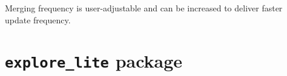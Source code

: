Merging frequency is user-adjustable and can be increased to deliver faster update frequency.

\section{\texttt{explore\_lite} package} %
\label{sec:explore_lite-package}


